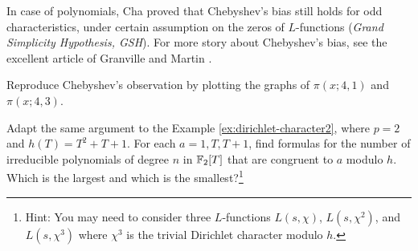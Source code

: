 In case of polynomials, Cha \cite{cha2008chebyshev} proved that Chebyshev's bias still holds for odd characteristics, under certain assumption on the zeros of $L$-functions (\emph{Grand Simplicity Hypothesis, GSH}).
For more story about Chebyshev's bias, see the excellent article of Granville and Martin \cite{granville2006prime}.

\begin{exercise}\sage
    Reproduce Chebyshev's observation by plotting the graphs of $\pi(x;4,1)$ and $\pi(x;4,3)$.
\end{exercise}

\begin{exercise}
    Adapt the same argument to the Example \ref{ex:dirichlet-character2}, where $p = 2$ and $h(T) = T^2 + T + 1$.
    For each $a = 1, T, T + 1$, find formulas for the number of irreducible polynomials of degree $n$ in $\mathbb{F}_2[T]$ that are congruent to $a$ modulo $h$.
    Which is the largest and which is the smallest?\footnote{Hint: You may need to consider three $L$-functions $L(s, \chi)$, $L(s, \chi^2)$, and $L(s, \chi^3)$ where $\chi^3$ is the trivial Dirichlet character modulo $h$.}
\end{exercise}